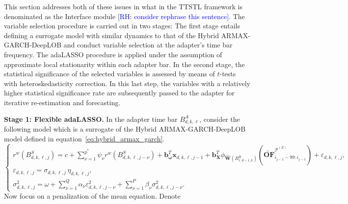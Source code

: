 \documentclass[10pt,a4paper,oneside]{article}
\newcommand{\rh}[1]{\textcolor{blue}{\textsf{[RH: #1]}}}
\begin{document}
This section addresses both of these issues in what in the TTSTL framework is denominated as the Interface module \rh{consider rephrase this sentence}. The variable selection procedure is carried out in two stages: The first stage entails defining a surrogate model with similar dynamics to that of the Hybrid ARMAX-GARCH-DeepLOB and conduct variable selection at the adapter's time bar frequency. The adaLASSO procedure is applied under the assumption of approximate local stationarity within each adapter bar. In the second stage, the statistical significance of the selected variables is assessed by means of \(t\)-tests with heteroskedasticity correction. In this last step, the variables with a relatively higher statistical significance rate are subsequently passed to the adapter for iterative re-estimation and forecasting.
\medskip

\noindent\textbf{Stage 1: Flexible adaLASSO.}  In the adapter time bar $B^A_{d, k, \ell}$, consider the following model which is a surrogate of the Hybrid ARMAX-GARCH-DeepLOB model defined in equation~\eqref{eq:hybrid_armax_garch}.
\begin{equation}
    \begin{cases}
        r^w\left( B^S_{d, k, \ell, j} \right) = c + \sum^{p^*}_{\nu = 1} \psi_{\nu} r^w \left( B^S_{d, k, \ell, j - \nu} \right) + \mathbf{b}_{\boldsymbol{\omega}}^T \mathbf{x}_{d, k, \ell, j - 1} + \mathbf{b}^T_{\mathbf{X}}\phi_{\hat{\mathbf{W}}\left( B^B_{1:d - 1, k} \right)} \left( \widetilde{\mathbf{OF}}^{\mathcal{P}^{(E)}}_{i_{j - 1} - 99:i_{j - 1}} \right) + \varepsilon_{d, k, \ell, j}, \\[6pt]
        \varepsilon_{d, k, \ell, j} = \sigma_{d, k, \ell, j} \,\eta_{d, k, \ell, j},                                                                                                                                                                                                                                                                                                                        \\[6pt]
        \sigma_{d, k, \ell, j}^2 = \omega + \sum^{Q}_{\nu = 1} \alpha_{\nu} \varepsilon^2_{d, k, \ell, j - \nu} + \sum^P_{\nu = 1} \beta_{\nu} \sigma_{d, k, \ell, j - \nu}^2.
    \end{cases}
    \label{eq:surrogate}
\end{equation}
Now focus on a penalization of the mean equation.  Denote
\end{document}
